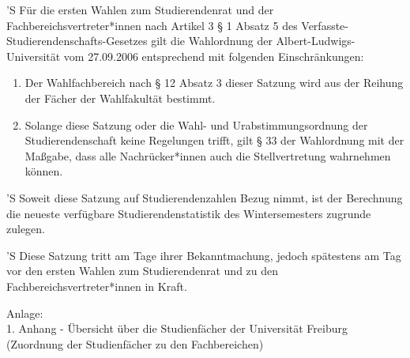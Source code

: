 \documentclass[fontsize=12pt,parskip=half]{scrartcl}
\begin{document}
\begin{contract}


  'S Für die ersten Wahlen zum Studierendenrat und der Fachbereichsvertreter*innen
  nach Artikel 3 § 1 Absatz 5 des Verfasste-Studierendenschafts-Gesetzes gilt
  die Wahlordnung der Albert-Ludwigs-Universität vom 27.09.2006 entsprechend mit
  folgenden Einschränkungen:
  \begin{enumerate}[\qquad 1.]
    \item Der Wahlfachbereich nach § 12 Absatz 3 dieser Satzung wird aus der
      Reihung der Fächer der Wahlfakultät bestimmt.
    \item Solange diese Satzung oder die Wahl- und Urabstimmungsordnung der
      Studierendenschaft keine Regelungen trifft, gilt § 33 der Wahlordnung mit
      der Maßgabe, dass alle Nachrücker*innen auch die Stellvertretung
      wahrnehmen können.
  \end{enumerate}



  'S Soweit diese Satzung auf Studierendenzahlen Bezug nimmt, ist der Berechnung
  die neueste verfügbare Studierendenstatistik des Wintersemesters zugrunde
  zulegen.

  'S Diese Satzung tritt am Tage ihrer Bekanntmachung, jedoch spätestens am Tag vor
  den ersten Wahlen zum Studierendenrat und zu den Fachbereichsvertreter*innen
  in Kraft.

\end{contract}

\vspace{2cm}
Anlage: \\
1. Anhang - Übersicht über die Studienfächer der Universität Freiburg \\
\qquad (Zuordnung der Studienfächer zu den Fachbereichen)
\end{document}

